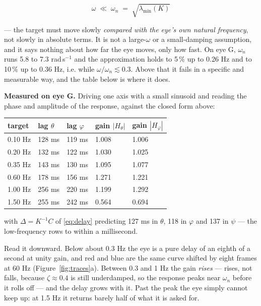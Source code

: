 \documentclass[10pt]{article}
\begin{document}
\begin{equation}
\label{eq:lowfreq}
\omega \;\ll\; \omega_n \;=\; \sqrt{\lambda_{\min}(K)}
\end{equation}

--- the target must move slowly \emph{compared with the eye's own natural frequency}, not
slowly in absolute terms. It is not a large-$\omega$ or a small-damping assumption, and it
says nothing about how far the eye moves, only how fast. On eye G, $\omega_n$ runs 5.8 to
7.3 rad\,s$^{-1}$ and the approximation holds to 5\,\% up to 0.26 Hz and to 10\,\% up to
0.36 Hz, i.e. while $\omega/\omega_n \lesssim 0.3$. Above that it fails in a specific and
measurable way, and the table below is where it does.

\textbf{Measured on eye G.} Driving one axis with a small sinusoid and reading the phase and
amplitude of the response, against the closed form above:

\begin{center}\small
\begin{tabular}{lllll}\toprule
target & lag $\theta$ & lag $\varphi$ & gain $|H_{\theta}|$ & gain $|H_{\varphi}|$ \\\midrule
0.10 Hz & 128 ms & 119 ms & 1.008 & 1.006 \\
0.20 Hz & 132 ms & 122 ms & 1.030 & 1.025 \\
0.35 Hz & 143 ms & 130 ms & 1.095 & 1.077 \\
0.60 Hz & 178 ms & 156 ms & 1.271 & 1.221 \\
1.00 Hz & 256 ms & 220 ms & 1.199 & 1.292 \\
1.50 Hz & 255 ms & 242 ms & 0.564 & 0.694 \\
\bottomrule\end{tabular}\end{center}

with $\Delta=K^{-1}C$ of \eqref{eq:delay} predicting 127 ms in $\theta$, 118 in $\varphi$
and 137 in $\psi$ --- the low-frequency rows to within a millisecond.

Read it downward. Below about 0.3 Hz the eye is a pure delay of an eighth of a second at
unity gain, and red and blue are the same curve shifted by eight frames at 60 Hz
(Figure~\ref{fig:traces}a). Between 0.3 and 1 Hz the gain \emph{rises} --- rises, not falls,
because $\zeta\approx0.4$ is still underdamped, so the response peaks near $\omega_n$ before
it rolls off --- and the delay grows with it. Past the peak the eye simply cannot keep up:
at 1.5 Hz it returns barely half of what it is asked for.
\end{document}
